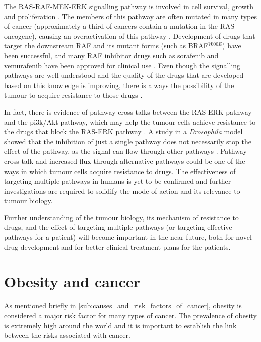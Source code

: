 The RAS-RAF-MEK-ERK signalling pathway is  involved in cell survival, growth and proliferation \citep{Samatar2014,Wilhelm2006}.
The members of this pathway are often mutated in many types of cancer (approximately a third of cancers contain a mutation in the RAS oncogene), causing an overactivation of this pathway \citep{Samatar2014}.
Development of drugs that target  the downstream RAF and its mutant forms (such as BRAF$^{V600E}$) have been successful, and many RAF inhibitor drugs such as sorafenib and vemurafenib have been approved for clinical use \citep{Samatar2014,Wilhelm2006}.
Even though the signalling pathways are well understood and the quality of the drugs that are developed based on this knowledge is improving, there is always the possibility of the tumour to acquire resistance to those drugs \citep{Samatar2014}.

In fact, there is evidence of pathway cross-talks between the RAS-ERK pathway and the \gls{pi3k}/Akt pathway, which may help the tumour cells achieve resistance to the  drugs that block the RAS-ERK pathway \citep{Moelling2002,Zimmermann1999a}.
A study in a \textit{Drosophila} model showed that the inhibition of just a single pathway does not necessarily stop the effect of the pathway, as the signal can flow through other pathways \citep{Dar2012}.
Pathway cross-talk and increased flux through alternative pathways could be one of the ways in which tumour cells acquire resistance to drugs.
The effectiveness of targeting multiple pathways in humans is yet to be confirmed and further investigations are required to solidify the mode of action and its relevance to tumour biology.

Further understanding of the tumour biology, its mechanism of resistance to drugs, and the effect of targeting multiple pathways (or targeting effective pathways for a patient) will become important in the near future, both for novel drug development and for better clinical treatment plans for the patients.

\section{Obesity and cancer}
\label{sec:obesity_and_cancer}

As mentioned briefly in \cref{sub:causes_and_risk_factors_of_cancer}, obesity is considered a major risk factor for many types of cancer.
The prevalence of obesity is extremely high around the world and  it is important to establish the link between the risks associated with cancer.

